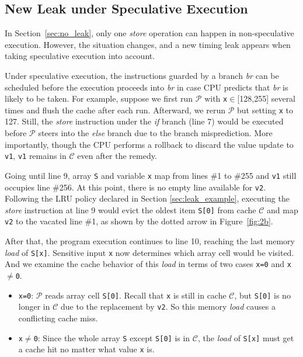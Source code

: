 \documentclass[sigconf,screen]{acmart}
\newcommand{\prog}{\mathcal{P}}
\begin{document}
\subsection{New Leak under Speculative Execution}
\label{sec:specu_leak}

In Section~\ref{sec:no_leak}, only one \textit{store} operation can happen 
in non-speculative execution. However, the situation changes, and a new timing 
leak appears when taking speculative execution into account.  


Under speculative execution, the instructions guarded by a branch \emph{br} can 
be scheduled before the execution proceeds into \emph{br} in case CPU predicts 
that \emph{br} is likely to be taken. For example, suppose we first run $\prog$ 
with \texttt{x}$\in$[128,255] several times and flush the cache after each run. 
Afterward, we rerun $\prog$ but setting \texttt{x} to 127. Still, the 
\textit{store} instruction under the \emph{if} branch (line 7) would be executed 
before $\prog$ steers into the \emph{else} branch due to the branch misprediction. 
More importantly, though the CPU performs a rollback to discard the value update 
to \texttt{v1}, \texttt{v1} remains in $\mathcal{C}$ even after the remedy. 


Going until line 9, array \texttt{S} and variable \texttt{x} map from lines \#1 
to \#255 and \texttt{v1} still occupies line \#256. At this point, there is no 
empty line available for \texttt{v2}. Following the LRU policy declared in Section
\ref{sec:leak_example}, executing the \textit{store} instruction at line 9 would 
evict the oldest item \texttt{S[0]} from cache $\mathcal{C}$ and map \texttt{v2} 
to the vacated line \#1, as shown by the dotted arrow in Figure~\ref{fig:2b}.


After that, the program execution continues to line 10, reaching the last memory 
\textit{load} of \texttt{S[x]}. Sensitive input \texttt{x} now determines which 
array cell would be visited. And we examine the cache behavior of this \textit{load} 
in terms of two cases \texttt{x=0} and \texttt{x$\neq$0}.


\begin{itemize}
  \item \texttt{x=0}: $\prog$ reads array cell \texttt{S[0]}. Recall that \texttt{x} 
	is still in cache $\mathcal{C}$, but \texttt{S[0]} is no longer in $\mathcal{C}$ 
	due to the replacement by \texttt{v2}. So this memory \textit{load}	causes a 
	conflicting cache miss.
  \item \texttt{x$\neq$0}: Since the whole array \texttt{S} except \texttt{S[0]}
    is in $\mathcal{C}$, the \textit{load} of \texttt{S[x]} must get a cache hit 
	no matter what value \texttt{x} is.
\end{itemize}
\end{document}
